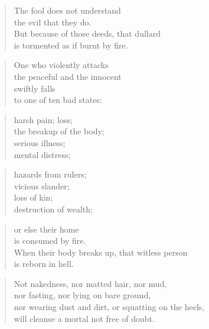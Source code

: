 \documentclass[12pt,openany]{book}%
\begin{document}
\begin{verse}%
The fool does not understand \\
the evil that they do. \\
But because of those deeds, that dullard \\
is tormented as if burnt by fire. 

%
\end{verse}

\begin{verse}%
One who violently attacks \\
the peaceful and the innocent \\
swiftly falls \\
to one of ten bad states: 

%
\end{verse}

\begin{verse}%
harsh pain; loss; \\
the breakup of the body; \\
serious illness; \\
mental distress; 

%
\end{verse}

\begin{verse}%
hazards from rulers; \\
vicious slander; \\
loss of kin; \\
destruction of wealth; 

%
\end{verse}

\begin{verse}%
or else their home \\
is consumed by fire. \\
When their body breaks up, that witless person \\
is reborn in hell. 

%
\end{verse}

\begin{verse}%
Not nakedness, nor matted hair, nor mud, \\
nor fasting, nor lying on bare ground, \\
nor wearing dust and dirt, or squatting on the heels, \\
will cleanse a mortal not free of doubt. 

%
\end{verse}
\end{document}
